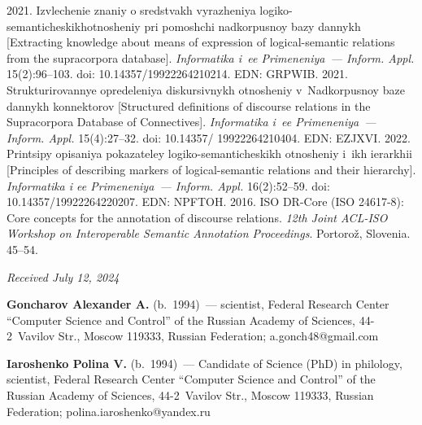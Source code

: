\begin{multicols}{2}
{{\begin{thebibliography}{99}
\columnbreak

 2021. Izvlechenie znaniy o sredstvakh vyrazheniya 
logiko-semanticheskikh\linebreak otnosheniy pri pomoshchi nadkorpusnoy bazy dannykh [Extracting 
knowledge about means of expression of logical-semantic relations from the supracorpora 
database]. \textit{Informatika i~ee Primeneniya~--- \mbox{Inform.} \mbox{Appl}.} 15(2):96--103. doi:  10.14357/19922264210214. EDN: GRPWIB.
 2021. Strukturirovannye opredeleniya 
diskursivnykh otnosheniy v~Nadkorpusnoy baze dannykh konnektorov [Structured definitions 
of discourse relations in the Supracorpora Database of Connectives]. \textit{Informatika i~ee 
Primeneniya~--- Inform. Appl.} 15(4):27--32. doi: 10.14357/ 19922264210404. EDN: EZJXVI.
 2022. Printsipy opisaniya 
pokazateley logiko-semanticheskikh otnosheniy i~ikh ierarkhii [Principles of describing markers 
of logical-semantic relations and their hierarchy]. \textit{Informatika i ee Primeneniya~--- Inform. Appl.} 
16(2):52--59. doi: 10.14357/19922264220207. EDN: NPFTOH.
 2016. ISO DR-Core (ISO 24617-8): Core concepts for the 
annotation of discourse relations. \textit{12th Joint ACL-ISO Workshop on Interoperable 
Semantic Annotation Proceedings}. Portoro{\hspace*{-0.5pt}\!\ptb\v{z}}, Slovenia. 45--54.



\end{thebibliography}

 }
 }

\end{multicols}

\vspace*{-6pt}

\hfill{\small\textit{Received July 12, 2024}} 

\vspace*{-18pt}

\Contr

\vspace*{-3pt}

\noindent
\textbf{Goncharov Alexander A.} (b.\ 1994)~--- scientist, Federal Research Center ``Computer 
Science and Control'' of the Russian Academy of Sciences, 44-2~Vavilov Str., Moscow 119333, 
Russian Federation; \mbox{a.gonch48@gmail.com}

\vspace*{3pt}

\noindent
\textbf{Iaroshenko Polina V.} (b.\ 1994)~--- Candidate of Science (PhD) in philology, scientist, 
Federal Research Center ``Computer Science and Control'' of the Russian Academy of Sciences, 
44-2~Vavilov Str., Moscow 119333, Russian Federation; \mbox{polina.iaroshenko@yandex.ru}

\label{end\stat}

\renewcommand{\bibname}{\protect\rm Литература} 